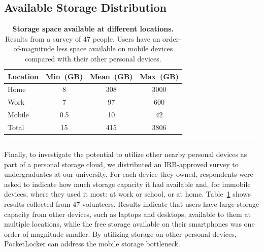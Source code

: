 \subsection{Available Storage Distribution}

\begin{table}[t]
{\small
\begin{tabularx}{\columnwidth}{Xccc}

\textbf{Location} & \textbf{Min~(GB)} & \textbf{Mean~(GB)} &
\textbf{Max~(GB)} \\ \toprule
Home & 8 & 308 & 3000 \\
Work & 7 & 97 & 600 \\
Mobile & 0.5 & 10 & 42 \\
Total & 15 & 415 & 3806 \\

\end{tabularx}
}
\caption{\small \textbf{Storage space available at different locations.}
Results from a survey of 47 people. Users have an order-of-magnitude less
space available on mobile devices compared with their other personal
devices.}

\label{table-storagesurvey}
\hrule
\end{table}

Finally, to investigate the potential to utilize other nearby personal
devices as part of a personal storage cloud, we distributed an IRB-approved
survey to undergraduates at our university. For each device they owned,
respondents were asked to indicate how much storage capacity it had available
and, for immobile devices, where they used it most: at work or school, or at
home. Table~\ref{table-storagesurvey} shows results collected from 47
volunteers. Results indicate that users have large storage capacity from
other devices, such as laptops and desktops, available to them at multiple
locations, while the free storage available on their smartphones was one
order-of-magnitude smaller. By utilizing storage on other personal devices,
PocketLocker can address the mobile storage bottleneck.

